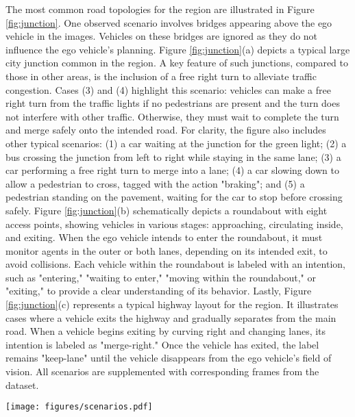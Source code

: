 The most common road topologies for the region are illustrated in Figure \ref{fig:junction}. One observed scenario involves bridges appearing above the ego vehicle in the images. Vehicles on these bridges are ignored as they do not influence the ego vehicle's planning. Figure \ref{fig:junction}(a) depicts a typical large city junction common in the region. A key feature of such junctions, compared to those in other areas, is the inclusion of a free right turn to alleviate traffic congestion. Cases (3) and (4) highlight this scenario: vehicles can make a free right turn from the traffic lights if no pedestrians are present and the turn does not interfere with other traffic. Otherwise, they must wait to complete the turn and merge safely onto the intended road. For clarity, the figure also includes other typical scenarios: (1) a car waiting at the junction for the green light; (2) a bus crossing the junction from left to right while staying in the same lane; (3) a car performing a free right turn to merge into a lane; (4) a car slowing down to allow a pedestrian to cross, tagged with the action "braking"; and (5) a pedestrian standing on the pavement, waiting for the car to stop before crossing safely. Figure \ref{fig:junction}(b) schematically depicts a roundabout with eight access points, showing vehicles in various stages: approaching, circulating inside, and exiting. When the ego vehicle intends to enter the roundabout, it must monitor agents in the outer or both lanes, depending on its intended exit, to avoid collisions. Each vehicle within the roundabout is labeled with an intention, such as "entering," "waiting to enter," "moving within the roundabout," or "exiting," to provide a clear understanding of its behavior. Lastly, Figure \ref{fig:junction}(c) represents a typical highway layout for the region. It illustrates cases where a vehicle exits the highway and gradually separates from the main road. When a vehicle begins exiting by curving right and changing lanes, its intention is labeled as "merge-right." Once the vehicle has exited, the label remains "keep-lane" until the vehicle disappears from the ego vehicle’s field of vision. All scenarios are supplemented with corresponding frames from the dataset.

\begin{figure*}[h!]
\centering
\texttt{[image: figures/scenarios.pdf]}
\caption{Common traffic scenarios in the UAE include: (a) large city junctions, often featuring unique elements like free right turns to reduce congestion, (b) roundabouts with vehicles navigating through various stages such as approaching, circulating, and exiting, and (c) highways with exits, where vehicles transition smoothly by merging into designated lanes and exiting the main road.}
\label{fig:junction}
\end{figure*}

